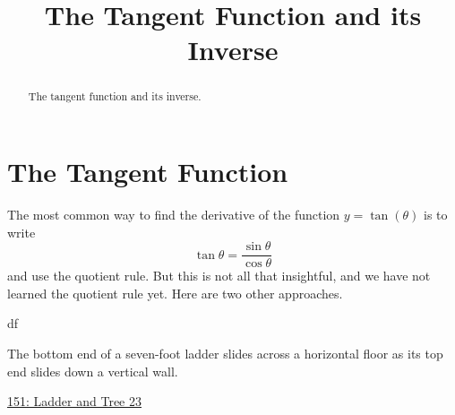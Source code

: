 \documentclass{ximera}
\title{The Tangent Function and its Inverse}
\begin{document}
\begin{abstract}
The tangent function and its inverse.
\end{abstract}
\maketitle


\section{The Tangent Function}

The most common way to find the derivative of the function $y=\tan(\theta)$ is to write 
\[
  \tan\theta = \frac{\sin\theta}{\cos \theta}
\]
and use the quotient rule. But this is not all that insightful, and we have not learned the quotient rule yet. Here are two other approaches.

\begin{question}  \label{QPDeredsRMNFR}
df
\end{question}




\begin{question}  \label{Qhfhghllllgg}
The bottom end of a seven-foot ladder slides across a horizontal floor as its top end slides down a vertical wall.

\begin{onlineOnly}
   \begin{center}
\end{center}
\end{onlineOnly}

\href{https://www.desmos.com/calculator/4nmxshey0e}{151: Ladder and Tree 23}  

\end{question}
\end{document}
